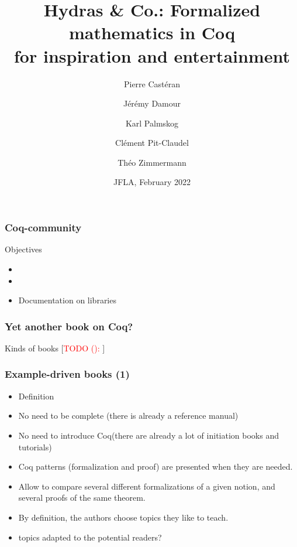 \documentclass[10pt]{beamer}
\title{Hydras \& Co.: Formalized mathematics in Coq\\
 for inspiration and entertainment
}
\date{JFLA, February 2022}
\author{
Pierre Castéran \inst{1}
\and
    Jérémy Damour \inst{2}
\and
Karl Palmskog \inst{3}
\and Clément Pit-Claudel \inst{4}
\and Théo Zimmermann \inst{5}
}
\institute{
Univ. Bordeaux, CNRS, Bordeaux INP, LaBRI, UMR 5800, F-33400 Talence, France  %
\and
Univ. de Paris, F-75013 Paris, France
\and
KTH Royal Institute of Technology, Stockholm, Sweden
\and
MIT CSAIL, Cambridge, Massachusetts, USA
\and
Inria, Univ. de Paris, CNRS, IRIF, UMR 8243, F-75013 Paris, France
}
\newcommand{\TODO}[2][]{[\textcolor{red}{TODO (#1):} \emph{#2}]}
\newcommand{\coq}{Coq\xspace}
\begin{document}
\begin{frame}
  \maketitle
\end{frame}
\begin{frame}
  \frametitle{Coq-community}
  \begin{block}{Objectives}
    \begin{itemize}
    \item \TODO{}{}
    \item\TODO{}{}
      \item Documentation on libraries
    \end{itemize}
  \end{block}
\end{frame}
\begin{frame}
  \frametitle{Yet another book on \coq?}
  \begin{block}{Kinds of books}
    \TODO{}{}
  \end{block}
\end{frame}
\begin{frame}
  \frametitle{Example-driven books (1)}
  \begin{block}{}
    \begin{itemize}
    \item \TODO{}{Definition}
    \item No need to be complete (there is already a reference manual)
      \item No need to introduce \coq (there are already a lot of initiation books and tutorials)
    \item \coq patterns (formalization and proof) are presented  when they are needed.
    \item Allow to compare several different formalizations of a given notion, and several proofs of the same theorem.
    \item By definition, the authors choose topics they like to teach.
      \item \TODO{}{topics adapted to the potential readers?}
    \end{itemize}
  \end{block}
\end{frame}
    
\end{document}
